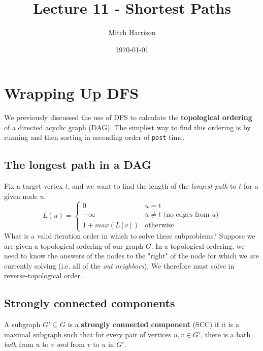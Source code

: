 \documentclass[titlepage, 12pt, leqno]{article}
\title{\Huge{Lecture 11 - Shortest Paths}}
\author{\large{Mitch Harrison}}
\date{\today}
\begin{document}
\setlength{\parskip}{1\baselineskip}
\setlength{\parindent}{15pt}
\maketitle
\tableofcontents
\newpage


\section{Wrapping Up DFS}

We previously discussed the use of DFS to calculate the \textbf{topological
ordering} of a directed acyclic graph (DAG). The simplest way to find this
ordering is by running  and then sorting in ascending order of
\texttt{post} time.

\subsection{The longest path in a DAG}
Fix a target vertex $t$, and we want to find the length of the \textit{longest
path} to $t$ for a given node $u$.
\[
L(u) =
\begin{cases}
    0 & u=t \\
    -\infty & u\ne t \text{ (no edges from $u$)}\\
    1 + max(L[v]) & \text{otherwise}
\end{cases}
\]
What is a valid iteration order in which to solve these subproblems? Suppose we
are given a topological ordering of our graph $G$. In a topological ordering,
we need to know the answers of the nodes to the "right" of the node for which 
we are currently solving (i.e. all of the \textit{out neighbors}). We therefore
must solve in reverse-topological order.

\subsection{Strongly connected components}
\begin{definition}
    A subgraph $G' \subseteq G$ is a \textbf{strongly connected component} (SCC)
    if it is a maximal subgraph such that for every pair of vertices 
    $u,v \in G'$, there is a bath \textit{both} from $u$ to $v$ \textit{and} 
    from $v$ to $u$ in $G'$.
\end{definition}
\end{document}
